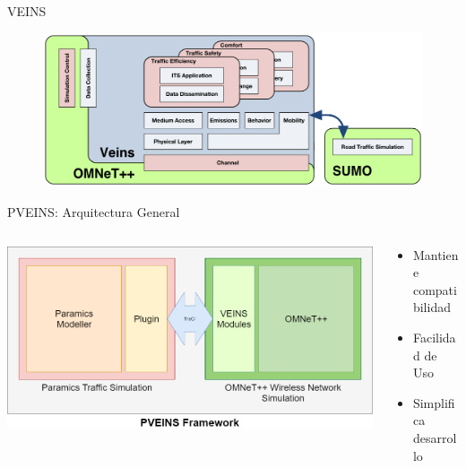 \documentclass[aspectratio=169]{beamer}
\begin{document}
\begin{frame}{VEINS}
\begin{figure}
    \centering
    \includegraphics[width=\linewidth]{figuras/veins-arch.png}
\end{figure}
\end{frame}

\begin{frame}{PVEINS: Arquitectura General}
\begin{columns}
    \begin{column}{.7\linewidth}
        \centering
        \includegraphics[width=\linewidth]{figuras/PVEINSArch.png}
    \end{column}
    \begin{column}{.3\linewidth}
        \begin{itemize}
            \item Mantiene compatibilidad
            \item Facilidad de Uso
            \item Simplifica desarrollo
        \end{itemize}
    \end{column}
\end{columns}
\end{frame}
\end{document}
